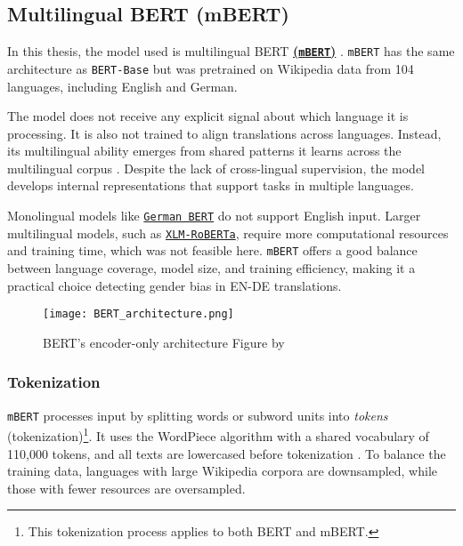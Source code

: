 \subsection{Multilingual BERT (mBERT)}
    In this thesis, the model used is multilingual BERT \textbf{\href{https://huggingface.co/google-bert/bert-base-multilingual-cased}{(\texttt{mBERT})}} \parencite{devlinBERTPretrainingDeep2019}. \texttt{mBERT} has the same architecture as \texttt{BERT-Base} but was pretrained on Wikipedia data from 104 languages, including English and German.
    
    The model does not receive any explicit signal about which language it is processing. It is also not trained to align translations across languages. Instead, its multilingual ability emerges from shared patterns it learns across the multilingual corpus \parencite{piresHowMultilingualMultilingual2019}. Despite the lack of cross-lingual supervision, the model develops internal representations that support tasks in multiple languages.

    Monolingual models like \href{https://huggingface.co/google-bert/bert-base-german-cased}{\texttt{German BERT}} do not support English input. Larger multilingual models, such as \href{https://huggingface.co/docs/transformers/en/model_doc/xlm-roberta}{\texttt{XLM-RoBERTa}}, require more computational resources and training time, which was not feasible here. \texttt{mBERT} offers a good balance between language coverage, model size, and training efficiency, making it a practical choice detecting gender bias in EN-DE translations.

\begin{figure}
    \centering
	\texttt{[image: BERT\_architecture.png]}	
    \caption[BERT's encoder-only architecture]{BERT's encoder-only architecture Figure by \textcite{smithCompleteGuideBERT2024}}
    \label{fig:bert_arch}
\end{figure}

\subsubsection{Tokenization}
\texttt{mBERT} processes input by splitting words or subword units into \textit{tokens} (tokenization)\footnote{This tokenization process applies to both BERT and mBERT.}. It uses the WordPiece algorithm with a shared vocabulary of 110,000 tokens, and all texts are lowercased before tokenization \parencite{devlinMultilingualBERTGitHub2018}. To balance the training data, languages with large Wikipedia corpora are downsampled, while those with fewer resources are oversampled.

